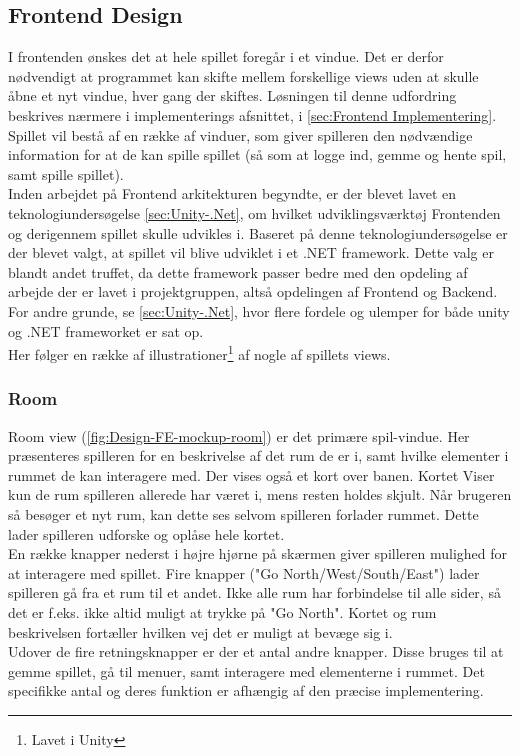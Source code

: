 \subsection{Frontend Design}

I frontenden ønskes det at hele spillet foregår i et vindue. Det er derfor nødvendigt at programmet kan skifte mellem forskellige views uden at skulle åbne et nyt vindue, hver gang der skiftes. Løsningen til denne udfordring beskrives nærmere i implementerings afsnittet, i \autoref{sec:Frontend Implementering}.
Spillet vil bestå af en række af vinduer, som giver spilleren den nødvændige information for at de kan spille spillet (så som at logge ind, gemme og hente spil, samt spille spillet).\\
Inden arbejdet på Frontend arkitekturen begyndte, er der blevet lavet en teknologiundersøgelse \autoref{sec:Unity-.Net}, om hvilket udviklingsværktøj Frontenden og derigennem spillet skulle udvikles i. Baseret på denne teknologiundersøgelse er der blevet valgt, at spillet vil blive udviklet i et .NET framework. Dette valg er blandt andet truffet, da dette framework passer bedre med den opdeling af arbejde der er lavet i projektgruppen, altså opdelingen af Frontend og Backend. For andre grunde, se \autoref{sec:Unity-.Net}, hvor flere fordele og ulemper for både unity og .NET frameworket er sat op.\\
Her følger en række af illustrationer\footnote{Lavet i Unity} af nogle af spillets views.

\subsubsection{Room}

Room view (\autoref{fig:Design-FE-mockup-room}) er det primære spil-vindue. Her præsenteres spilleren for en beskrivelse af det rum de er i, samt hvilke elementer i rummet de kan interagere med. Der vises også et kort over banen. Kortet Viser kun de rum spilleren allerede har været i, mens resten holdes skjult. Når brugeren så besøger et nyt rum, kan dette ses selvom spilleren forlader rummet. Dette lader spilleren udforske og oplåse hele kortet.\\
En række knapper nederst i højre hjørne på skærmen giver spilleren mulighed for at interagere med spillet. Fire knapper ("Go {North/West/South/East}") lader spilleren gå fra et rum til et andet. Ikke alle rum har forbindelse til alle sider, så det er f.eks. ikke altid muligt at trykke på "Go North". Kortet og rum beskrivelsen fortæller hvilken vej det er muligt at bevæge sig i.\\
Udover de fire retningsknapper er der et antal andre knapper. Disse bruges til at gemme spillet, gå til menuer, samt interagere med elementerne i rummet. Det specifikke antal og deres funktion er afhængig af den præcise implementering.

